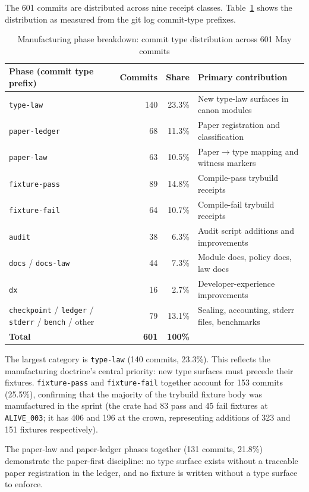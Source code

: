 The 601 commits are distributed across nine receipt classes. Table~\ref{tab:phase-breakdown}
shows the distribution as measured from the git log commit-type prefixes.

\begin{table}[ht]
\centering
\caption{Manufacturing phase breakdown: commit type distribution across 601 May commits}
\label{tab:phase-breakdown}
\begin{tabular}{@{}lrrl@{}}
\toprule
Phase (commit type prefix) & Commits & Share & Primary contribution \\
\midrule
\texttt{type-law}    & 140 & 23.3\% & New type-law surfaces in canon modules \\
\texttt{paper-ledger} & 68 & 11.3\% & Paper registration and classification \\
\texttt{paper-law}   & 63  & 10.5\% & Paper$\to$type mapping and witness markers \\
\texttt{fixture-pass} & 89 & 14.8\% & Compile-pass trybuild receipts \\
\texttt{fixture-fail} & 64 & 10.7\% & Compile-fail trybuild receipts \\
\texttt{audit}       & 38  &  6.3\% & Audit script additions and improvements \\
\texttt{docs} / \texttt{docs-law} & 44 & 7.3\% & Module docs, policy docs, law docs \\
\texttt{dx}          & 16  &  2.7\% & Developer-experience improvements \\
\texttt{checkpoint} / \texttt{ledger} / \texttt{stderr} / \texttt{bench} / other & 79 & 13.1\% & Sealing, accounting, stderr files, benchmarks \\
\midrule
\textbf{Total}       & \textbf{601} & \textbf{100\%} & \\
\bottomrule
\end{tabular}
\end{table}

The largest category is \texttt{type-law} (140 commits, 23.3\%). This reflects
the manufacturing doctrine's central priority: new type surfaces must precede
their fixtures. \texttt{fixture-pass} and \texttt{fixture-fail} together account
for 153 commits (25.5\%), confirming that the majority of the trybuild fixture
body was manufactured in the sprint (the crate had 83 pass and 45 fail fixtures
at \texttt{ALIVE\_003}; it has 406 and 196 at the crown, representing additions
of 323 and 151 fixtures respectively).

The paper-law and paper-ledger phases together (131 commits, 21.8\%) demonstrate
the paper-first discipline: no type surface exists without a traceable paper
registration in the ledger, and no fixture is written without a type surface to
enforce.

